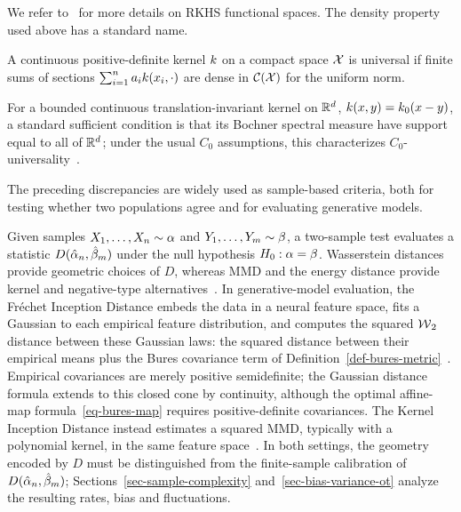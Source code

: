 We refer to~\cite{berlinet03reproducing,Hofmann2008,scholkopf2002learning} for more details on RKHS functional spaces. The density property used above has a standard name.

\begin{defn}\label{def-universal-kernel}
	A continuous positive-definite kernel $k$ on a compact space $\mathcal{X}$ is universal if finite sums of sections $\sum_{i=1}^n a_ik(x_i,\cdot)$ are dense in $\mathcal{C}(\mathcal{X})$ for the uniform norm.
\end{defn}

\begin{rem}
For a bounded continuous translation-invariant kernel on $\mathbb{R}^d$, $k(x,y)=k_0(x-y)$, a standard sufficient condition is that its Bochner spectral measure have support equal to all of $\mathbb{R}^d$; under the usual $C_0$ assumptions, this characterizes $C_0$-universality~\cite{SriperumbudurFukumizuLanckriet2011Universality}.
\end{rem}

The preceding discrepancies are widely used as sample-based criteria, both for testing whether two populations agree and for evaluating generative models.

\begin{example}\label{ex-two-sample-testing-fid}
	Given samples \(X_1,\ldots,X_n\sim\alpha\) and \(Y_1,\ldots,Y_m\sim\beta\), a two-sample test evaluates a statistic \(D(\hat{\alpha}_n,\hat{\beta}_m)\) under the null hypothesis \(H_0:\alpha=\beta\). Wasserstein distances provide geometric choices of \(D\), whereas MMD and the energy distance provide kernel and negative-type alternatives~\cite{ramdas2017wasserstein,gretton2012kernel,szekely2004testing}. In generative-model evaluation, the Fr\'echet Inception Distance embeds the data in a neural feature space, fits a Gaussian to each empirical feature distribution, and computes the squared \(\operatorname{\mathcal{W}}_2\) distance between these Gaussian laws: the squared distance between their empirical means plus the Bures covariance term of Definition~\ref{def-bures-metric}~\cite{HeuselRamsauerUnterthinerNesslerHochreiter2017FID}. Empirical covariances are merely positive semidefinite; the Gaussian distance formula extends to this closed cone by continuity, although the optimal affine-map formula~\eqref{eq-bures-map} requires positive-definite covariances. The Kernel Inception Distance instead estimates a squared MMD, typically with a polynomial kernel, in the same feature space~\cite{BinkowskiSutherlandArbelGretton2018MMDGAN}. In both settings, the geometry encoded by \(D\) must be distinguished from the finite-sample calibration of \(D(\hat{\alpha}_n,\hat{\beta}_m)\); Sections~\ref{sec-sample-complexity} and~\ref{sec-bias-variance-ot} analyze the resulting rates, bias and fluctuations.
\end{example}

